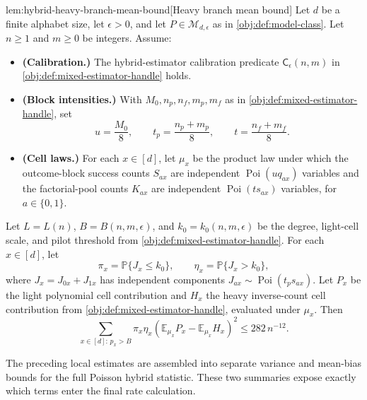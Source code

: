 \begin{lemmav}{lem:hybrid-heavy-branch-mean-bound}[Heavy branch mean bound]
Let \(d\) be a finite alphabet size, let \(\epsilon>0\), and let \(P\in\mathcal M_{d,\epsilon}\) as in \cref{obj:def:model-class}.  Let \(n\ge1\) and \(m\ge0\) be integers.  Assume:
\begin{itemize}
\item \textbf{(Calibration.)} The hybrid-estimator calibration predicate \(\mathsf C_\epsilon(n,m)\) in \cref{obj:def:mixed-estimator-handle} holds.
\item \textbf{(Block intensities.)} With \(M_0,n_p,n_f,m_p,m_f\) as in \cref{obj:def:mixed-estimator-handle}, set
\[
u=\frac{M_0}{8},\qquad
t_p=\frac{n_p+m_p}{8},\qquad
t=\frac{n_f+m_f}{8}.
\]
\item \textbf{(Cell laws.)} For each \(x\in[d]\), let \(\mu_x\) be the product law under which the outcome-block success counts \(S_{ax}\) are independent \(\operatorname{Poi}(u q_{ax})\) variables and the factorial-pool counts \(K_{ax}\) are independent \(\operatorname{Poi}(t s_{ax})\) variables, for \(a\in\{0,1\}\).
\end{itemize}
Let \(L=L(n)\), \(B=B(n,m,\epsilon)\), and \(k_0=k_0(n,m,\epsilon)\) be the degree, light-cell scale, and pilot threshold from \cref{obj:def:mixed-estimator-handle}.  For each \(x\in[d]\), let
\[
\pi_x=\mathbb P\{J_x\le k_0\},
\qquad
\eta_x=\mathbb P\{J_x>k_0\},
\]
where \(J_x=J_{0x}+J_{1x}\) has independent components \(J_{ax}\sim\operatorname{Poi}(t_p s_{ax})\).  Let \(P_x\) be the light polynomial cell contribution and \(H_x\) the heavy inverse-count cell contribution from \cref{obj:def:mixed-estimator-handle}, evaluated under \(\mu_x\).  Then
\[
\sum_{x\in[d]:\,p_x>B}
\pi_x\eta_x
\left(\mathbb E_{\mu_x}P_x-\mathbb E_{\mu_x}H_x\right)^2
\le 282\,n^{-12}.
\]
\end{lemmav}

The preceding local estimates are assembled into separate variance and mean-bias bounds for the full Poisson hybrid statistic. These two summaries expose exactly which terms enter the final rate calculation.

